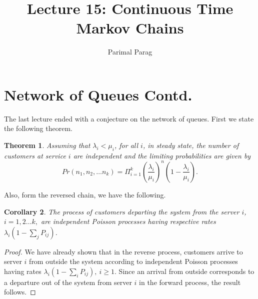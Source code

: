 \documentclass[a4paper,10pt]{article}
\date{}
\title{Lecture 15: Continuous Time Markov Chains}
\author{Parimal Parag}
\theoremstyle{plain}
\newtheorem{thm}{Theorem}[section]
\newtheorem{cor}[thm]{Corollary}
\theoremstyle{definition}
\theoremstyle{remark}
\begin{document}
\maketitle
\section{Network of Queues Contd.}
The last lecture ended with a conjecture on the network of queues. First we state the following theorem.
\begin{thm}
Assuming that $\lambda_i < \mu_i$, for all $i$, in steady state, the number of customers at service $i$ are independent and the limiting probabilities are given by
\begin{equation*}
Pr(n_1,n_2, \hdots n_k) = \Pi_{i=1}^{k}{(\frac{\lambda_i}{\mu_i})}^n (1-\frac{\lambda_i}{\mu_i}).
\end{equation*}
\end{thm}
Also, form the reversed chain, we have the following.
\begin{cor}
The process of customers departing the system from the server $i$, $i=1,2 \hdots k,$ are independent Poisson processes having respective rates $\lambda_i (1-\sum_j P_{ij} )$.
\end{cor}
\begin{proof}
We have already shown that in the reverse process, customers arrive to server $i$ from outside the system according to independent Poisson processes having rates $\lambda_i(1-\sum_{i}P_{ij}),~ i \geq 1$. Since an arrival from outside corresponds to a departure out of the system from server $i$ in the forward process, the result follows. 
\end{proof}
\end{document}
